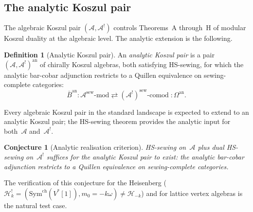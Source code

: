 \documentclass[11pt,reqno]{amsart}
\newtheorem{conjecture}[theorem]{Conjecture}
\theoremstyle{definition}
\newtheorem{definition}[theorem]{Definition}
\theoremstyle{remark}
\newcommand{\cA}{\mathcal{A}}
\newcommand{\cH}{\mathcal{H}}
\newcommand{\barB}{\bar{B}}
\newcommand{\Sym}{\mathrm{Sym}}
\numberwithin{equation}{section}
\begin{document}
\subsection{The analytic Koszul pair}\label{subsec:analytic-koszul}

The algebraic Koszul pair $(\cA, \cA^!)$ controls Theorems~A
through~H of modular Koszul duality
at the algebraic level.  The analytic extension is the
following.

\begin{definition}[Analytic Koszul pair]
\label{def:analytic-koszul-pair}
An \emph{analytic Koszul pair} is a pair
$(\cA, \cA^!)^{\mathrm{an}}$ of chirally Koszul algebras,
both satisfying HS-sewing, for which the analytic bar-cobar
adjunction restricts to a Quillen equivalence on
sewing-complete categories:
\[
\barB^{\mathrm{an}} \colon
\cA^{\mathrm{sew}}\text{-}\mathrm{mod}
\rightleftarrows
(\cA^!)^{\mathrm{sew}}\text{-}\mathrm{comod}
\;\colon\!
\Omega^{\mathrm{an}}.
\]
\end{definition}

Every algebraic Koszul pair in the standard landscape is
expected to extend to an analytic Koszul pair; the HS-sewing
theorem provides the analytic input for both~$\cA$
and~$\cA^!$.

\begin{conjecture}[Analytic realisation criterion]
\label{conj:analytic-realisation}
HS-sewing on~$\cA$ plus dual HS-sewing on~$\cA^!$ suffices
for the analytic Koszul pair to exist: the analytic bar-cobar
adjunction restricts to a Quillen equivalence on
sewing-complete categories.
\end{conjecture}

The verification of this conjecture for the Heisenberg
($\cH_k^!=(\Sym^{\mathrm{ch}}(V^*[1]),m_0=-k\omega)\neq \cH_{-k}$) and
for lattice vertex algebras is the natural test case.
\end{document}
